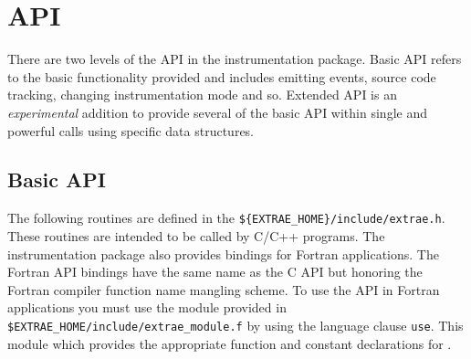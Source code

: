 \chapter{\TRACE API}\label{cha:API}

There are two levels of the API in the \TRACE instrumentation package. Basic API refers to the basic functionality provided and includes emitting events, source code tracking, changing instrumentation mode and so. Extended API is an {\em experimental} addition to provide several of the basic API within single and powerful calls using specific data structures.

\section{Basic API}\label{sec:BasicAPI}

The following routines are defined in the {\tt \$\{EXTRAE\_HOME\}/include/extrae.h}. These routines are intended to be called by C/C++ programs. The instrumentation package also provides bindings for Fortran applications. The Fortran API bindings have the same name as the C API but honoring the Fortran compiler function name mangling scheme. To use the API in Fortran applications you must use the module provided in {\tt \${EXTRAE\_HOME}/include/extrae\_module.f} by using the language clause {\tt use}. This module which provides the appropriate function and constant declarations for \TRACE.

